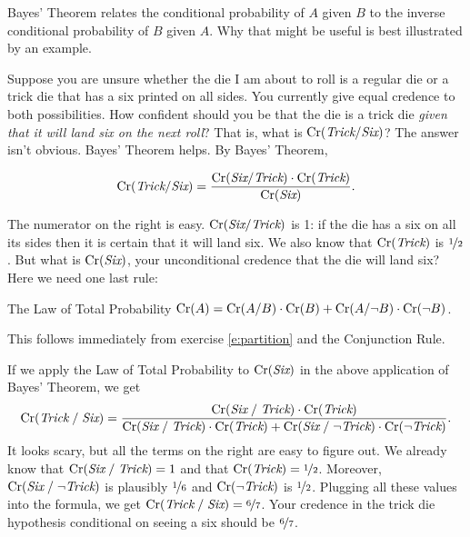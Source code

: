Bayes' Theorem relates the conditional probability of $A$ given $B$ to the
inverse conditional probability of $B$ given $A$. Why that might be useful is
best illustrated by an example.

Suppose you are unsure whether the die I am about to roll is a regular
die or a trick die that has a six printed on all sides. You currently
give equal credence to both possibilities. How confident should you be
that the die is a trick die \emph{given that it will land six on the
  next roll}? That is, what is $\text{Cr}(\emph{Trick}/ \emph{Six})$? The
answer isn't obvious. Bayes' Theorem helps. By Bayes' Theorem,

\[
  \text{Cr}(\emph{Trick}/\emph{Six}) = \frac{\text{Cr}(\emph{Six}/\emph{Trick}) \cdot \text{Cr}(\emph{Trick})}{\text{Cr}(\emph{Six})}.
\]

\medskip\noindent%
The numerator on the right is easy. $\text{Cr}(\emph{Six}/ \emph{Trick})$ is
1: if the die has a six on all its sides then it is certain that it
will land six. We also know that $\text{Cr}(\emph{Trick})$ is
$\nicefrac{1}{2}$. But what is $\text{Cr}(\emph{Six})$, your unconditional
credence that the die will land six? Here we need one last rule:

\begin{genericthm}{The Law of Total Probability}
  $\text{Cr}(A) = \text{Cr}(A/B)\cdot \text{Cr}(B) + \text{Cr}(A/\neg B)\cdot \text{Cr}(\neg B)$.
\end{genericthm}
%
\noindent%
This follows immediately from exercise \ref{e:partition}
and the Conjunction Rule.

If we apply the Law of Total Probability to $\text{Cr}(\emph{Six})$ in the above
application of Bayes' Theorem, we get
\[
  \text{Cr}(\emph{Trick}\;/\;\emph{Six}) = \frac{\text{Cr}(\emph{Six}\;/\;\emph{Trick}) \cdot \text{Cr}(\emph{Trick})}{
\text{Cr}(\emph{Six}\;/\;\emph{Trick}) \cdot \text{Cr}(\emph{Trick}) + \text{Cr}(\emph{Six}\;/\;\neg \emph{Trick}) \cdot \text{Cr}(\neg\emph{Trick})
}.
\]
It looks scary, but all the terms on the right are easy to figure out. We
already know that $\text{Cr}(\emph{Six}\;/\; \emph{Trick}) = 1$ and that
$\text{Cr}(\emph{Trick}) = \nicefrac{1}{2}$. Moreover,
$\text{Cr}(\emph{Six}\;/\; \neg\emph{Trick})$ is plausibly $\nicefrac{1}{6}$ and
$\text{Cr}(\neg \emph{Trick})$ is $\nicefrac{1}{2}$. Plugging all these values into
the formula, we get $\text{Cr}(\emph{Trick}\;/\;\emph{Six}) = \nicefrac{6}{7}$. Your
credence in the trick die hypothesis conditional on seeing a six should be
$\nicefrac{6}{7}$.


